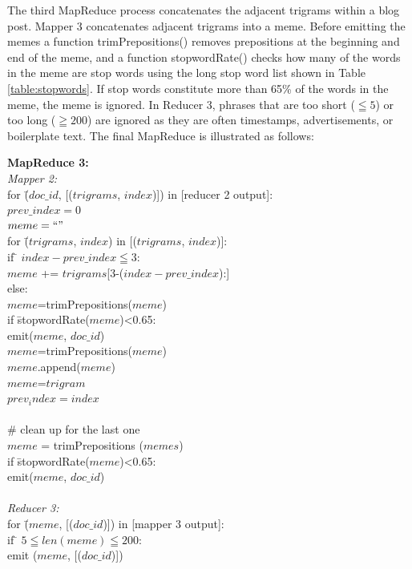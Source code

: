 \documentclass{sig-alternate}
\begin{document}
The third MapReduce process concatenates the adjacent trigrams within a blog post. Mapper 3 concatenates adjacent trigrams into a meme. Before emitting the memes a function trimPrepositions() removes prepositions at the beginning and end of the meme, and a function stopwordRate() checks how many of the words in the meme are stop words using the long stop word list shown in Table \ref{table:stopwords}. If stop words constitute more than 65\% of the words in the meme, the meme is ignored. In Reducer 3, phrases that are too short ($\leqq 5$) or too long ($\geqq 200$) are ignored as they are often timestamps, advertisements, or boilerplate text. The final MapReduce is illustrated as follows:

\begin{centering}
\begin{tabbing}
\textbf{MapReduce 3:}\\
\emph{Mapper 2:}\\

for \= ($doc\_id$, [($trigrams$, $index$)]) in [reducer 2 output]:\\
\>	$prev\_index=0$\\
\>	$meme=``"$\\
\>	for \= ($trigrams$, $index$) in [($trigrams$, $index$)]:\\
\>\>	if \= $index-prev\_index \leqq 3$:\\
\>\>\>		$meme$ += $trigrams$[3-($index-prev\_index$):]\\
\>\>	else:\\
\>\>\>		$meme$=trimPrepositions($meme$)\\
\>\>\>		if \= stopwordRate($meme$)<0.65:\\
\>\>\>\>		emit($meme$, $doc\_id$)\\
\>\>\>		$meme$=trimPrepositions($meme$)\\
\>\>\>		$meme$.append($meme$)\\
\>\>\>		$meme$=$trigram$\\
\>\>	$prev_index=index$\\
\\	
\>	\# clean up for the last one\\
\>		$meme$ = trimPrepositions ($memes$)\\
\>		if \= stopwordRate($meme$)<0.65:\\
\>\>		emit($meme$, $doc\_id$)\\
\\
\emph{Reducer 3:}\\
for \= ($meme$, [($doc\_id$)]) in [mapper 3 output]:\\
\> if \= $5 \leqq len(meme) \leqq 200$:\\
\>\>	emit ($meme$, [($doc\_id$)])

\end{tabbing}

\end{centering}
\end{document}
